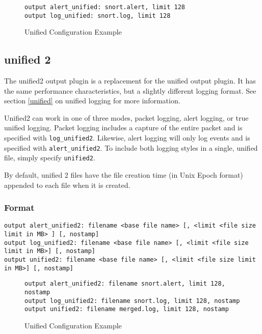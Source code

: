 \documentclass[english]{report}
\newenvironment{note}{
\samepage
    \vspace{10pt}{\textsf{
        {\hspace{7pt}\Huge{$\triangle$\hspace{-12.5pt}{\Large{$^!$}}}}\hspace{5pt}
        {\Large{NOTE}}
    }
    }
   \begin{center}
    \par\vspace{-17pt}

    \begin{lrbox}{\savepar}
    \begin{minipage}[r]{6in}
}
{
    \end{minipage}
    \end{lrbox}
    \fbox{
        \usebox{
            \savepar
	}
    }
    \par\vskip10pt
    \end{center}
}
\begin{document}
\begin{figure}[!hbpt]
\begin{verbatim}
output alert_unified: snort.alert, limit 128
output log_unified: snort.log, limit 128
\end{verbatim}
\caption{Unified Configuration Example\label{unified example}}
\end{figure}

\subsection{unified 2}

The unified2 output plugin is a replacement for the unified output plugin.  It
has the same performance characteristics, but a slightly different logging 
format.  See section \ref{unified} on unified logging for more information.

Unified2 can work in one of three modes, packet logging, alert logging, or
true unified logging.  Packet logging includes a capture of the entire packet
and is specified with \texttt{log\_unified2}.  Likewise, alert logging will only
log events and is specified with \texttt{alert\_unified2}.  To include both 
logging styles in a single, unified file, simply specify \texttt{unified2}.


\begin{note}
By default, unified 2 files have the file creation time (in Unix Epoch format) 
appended to each file when it is created.  
\end{note}

\subsubsection{Format}

\begin{verbatim}
output alert_unified2: filename <base file name> [, <limit <file size limit in MB> ] [, nostamp]
output log_unified2: filename <base file name> [, <limit <file size limit in MB>] [, nostamp]
output unified2: filename <base file name> [, <limit <file size limit in MB>] [, nostamp]
\end{verbatim}


\begin{figure}[!hbpt]
\begin{verbatim}
output alert_unified2: filename snort.alert, limit 128, nostamp
output log_unified2: filename snort.log, limit 128, nostamp
output unified2: filename merged.log, limit 128, nostamp
\end{verbatim}
\caption{Unified Configuration Example\label{unified example}}
\end{figure}
\end{document}
